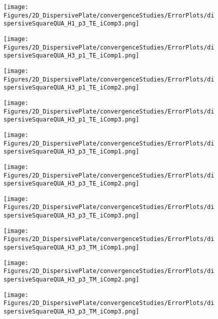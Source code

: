 \begin{figure}
\texttt{[image: Figures/2D\_DispersivePlate/convergenceStudies/ErrorPlots/dispersiveSquareQUA\_H1\_p3\_TE\_iComp3.png]}
\end{figure}

\clearpage

\begin{figure}
\texttt{[image: Figures/2D\_DispersivePlate/convergenceStudies/ErrorPlots/dispersiveSquareQUA\_H3\_p1\_TE\_iComp1.png]}
\end{figure}

\begin{figure}
\texttt{[image: Figures/2D\_DispersivePlate/convergenceStudies/ErrorPlots/dispersiveSquareQUA\_H3\_p1\_TE\_iComp2.png]}
\end{figure}

\begin{figure}
\texttt{[image: Figures/2D\_DispersivePlate/convergenceStudies/ErrorPlots/dispersiveSquareQUA\_H3\_p1\_TE\_iComp3.png]}
\end{figure}

\begin{figure}
\texttt{[image: Figures/2D\_DispersivePlate/convergenceStudies/ErrorPlots/dispersiveSquareQUA\_H3\_p3\_TE\_iComp1.png]}
\end{figure}

\begin{figure}
\texttt{[image: Figures/2D\_DispersivePlate/convergenceStudies/ErrorPlots/dispersiveSquareQUA\_H3\_p3\_TE\_iComp2.png]}
\end{figure}

\begin{figure}
\texttt{[image: Figures/2D\_DispersivePlate/convergenceStudies/ErrorPlots/dispersiveSquareQUA\_H3\_p3\_TE\_iComp3.png]}
\end{figure}

\begin{figure}
\texttt{[image: Figures/2D\_DispersivePlate/convergenceStudies/ErrorPlots/dispersiveSquareQUA\_H3\_p3\_TM\_iComp1.png]}
\end{figure}

\begin{figure}
\texttt{[image: Figures/2D\_DispersivePlate/convergenceStudies/ErrorPlots/dispersiveSquareQUA\_H3\_p3\_TM\_iComp2.png]}
\end{figure}

\begin{figure}
\texttt{[image: Figures/2D\_DispersivePlate/convergenceStudies/ErrorPlots/dispersiveSquareQUA\_H3\_p3\_TM\_iComp3.png]}
\end{figure}

